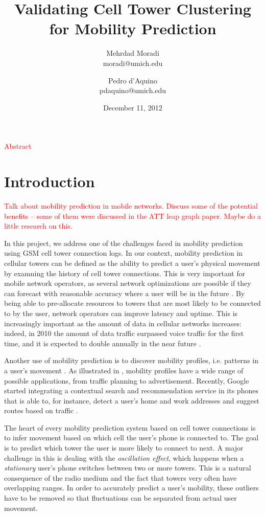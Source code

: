 \documentclass[letterpaper, 11pt, conference]{ieeeconf}
\newcommand{\xxx}[1]{\textcolor{red}{#1}}
\begin{document}
\title{Validating Cell Tower Clustering for Mobility Prediction}
\author{Mehrdad Moradi\\moradi@umich.edu \and Pedro d'Aquino\\pdaquino@umich.edu}
\date{December 11, 2012}

\maketitle

\xxx{Abstract}

\section{Introduction}
\label{sec:intro}
\xxx{Talk about mobility prediction in mobile networks. Discuss some of the potential benefits -- some of them were discussed in the
ATT leap graph paper. Maybe do a little research on this.}

In this project, we address one of the challenges faced in mobility prediction using GSM cell tower connection logs. In our context, mobility prediction in cellular
towers can be defined as the ability to predict a user's physical movement by examning the history of cell tower connections. This is very important
for mobile network operators, as several network optimizations are possible if they can forecast with reasonable accuracy
where a user will be in the future \cite{LeapGraph} \cite{Liu97anoptimal}. By being able to pre-allocate resources to towers that are most likely to
be connected to by the user, network operators can improve latency and uptime. This is increasingly important as the amount of data in cellular networks
increases: indeed, in 2010 the amount of data traffic surpassed voice traffic for the first time, and it is expected to double annually in the near future
\cite{EricssonData}.

Another use of mobility prediction is to discover mobility profiles, i.e. patterns in a user's movement \cite{mobilityprofiler}. As illustrated in \cite{mobilityprofiler}, mobility profiles have a wide range of possible applications, from traffic planning to advertisement. Recently, Google started integrating
a contextual search and recommendation service in its phones that is able to, for instance, detect a user's home and work addresses and suggest routes based on
traffic \cite{googleNow}.


The heart of every mobility prediction system based on cell tower connections is to infer movement based on which cell the user's phone is connected to. The goal
is to predict which tower the user is more likely to connect to next. A major challenge in this is dealing with the \textit{oscillation effect}, which happens when a \textit{stationary} user's phone switches between two or more towers. This is a natural consequence of the radio medium and the fact that towers very often have overlapping ranges. In order to accurately predict a user's mobility, these outliers have to be removed so that fluctuations can be separated from actual user movement.
\end{document}

